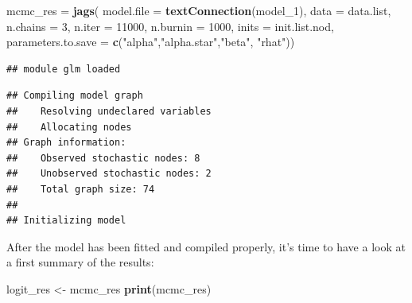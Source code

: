 \documentclass[]{article}
\newenvironment{Shaded}{\begin{snugshade}}{\end{snugshade}}
\newcommand{\DataTypeTok}[1]{\textcolor[rgb]{0.13,0.29,0.53}{#1}}
\newcommand{\DecValTok}[1]{\textcolor[rgb]{0.00,0.00,0.81}{#1}}
\newcommand{\KeywordTok}[1]{\textcolor[rgb]{0.13,0.29,0.53}{\textbf{#1}}}
\newcommand{\NormalTok}[1]{#1}
\newcommand{\StringTok}[1]{\textcolor[rgb]{0.31,0.60,0.02}{#1}}
\begin{document}
\begin{Shaded}
\begin{Highlighting}[]
\NormalTok{mcmc_res =}\StringTok{ }\KeywordTok{jags}\NormalTok{( }\DataTypeTok{model.file =} \KeywordTok{textConnection}\NormalTok{(model_}\DecValTok{1}\NormalTok{),}
                  \DataTypeTok{data =}\NormalTok{ data.list, }
                  \DataTypeTok{n.chains =} \DecValTok{3}\NormalTok{, }
                  \DataTypeTok{n.iter =} \DecValTok{11000}\NormalTok{, }
                  \DataTypeTok{n.burnin =} \DecValTok{1000}\NormalTok{,}
                  \DataTypeTok{inits =}\NormalTok{ init.list.nod, }
                  \DataTypeTok{parameters.to.save =} \KeywordTok{c}\NormalTok{(}\StringTok{"alpha"}\NormalTok{,}\StringTok{"alpha.star"}\NormalTok{,}\StringTok{"beta"}\NormalTok{, }\StringTok{"rhat"}\NormalTok{))}
\end{Highlighting}
\end{Shaded}

\begin{verbatim}
## module glm loaded
\end{verbatim}

\begin{verbatim}
## Compiling model graph
##    Resolving undeclared variables
##    Allocating nodes
## Graph information:
##    Observed stochastic nodes: 8
##    Unobserved stochastic nodes: 2
##    Total graph size: 74
## 
## Initializing model
\end{verbatim}

After the model has been fitted and compiled properly, it's time to have
a look at a first summary of the results:

\begin{Shaded}
\begin{Highlighting}[]
\NormalTok{logit_res <-}\StringTok{ }\NormalTok{mcmc_res}
\KeywordTok{print}\NormalTok{(mcmc_res)}
\end{Highlighting}
\end{Shaded}
\end{document}
